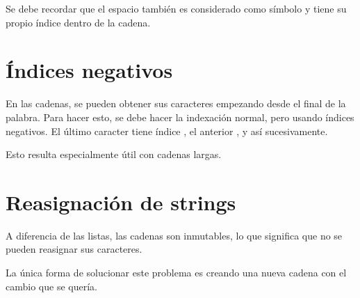 Se debe recordar que el espacio \ttt{\qq  \qq} también es considerado como símbolo y tiene su propio índice dentro de la cadena.

\section{Índices negativos}

En las cadenas, se pueden obtener sus caracteres empezando desde el final de la palabra.
Para hacer esto, se debe hacer la indexación normal, pero usando índices negativos.
El último caracter tiene índice , el anterior , y así sucesivamente.


Esto resulta especialmente útil con cadenas largas.

\section{Reasignación de strings}

A diferencia de las listas, las cadenas son inmutables, lo que significa que no se pueden reasignar sus caracteres.


La única forma de solucionar este problema es creando una nueva cadena con el cambio que se quería.


\clearpage